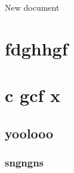 \documentclass{article}
\begin{document}
New document
\section{}
\section{fdghhgf}
\section{c gcf x}
\subsection{yoolooo}
\subsubsection{sngngns}
\end{document}

